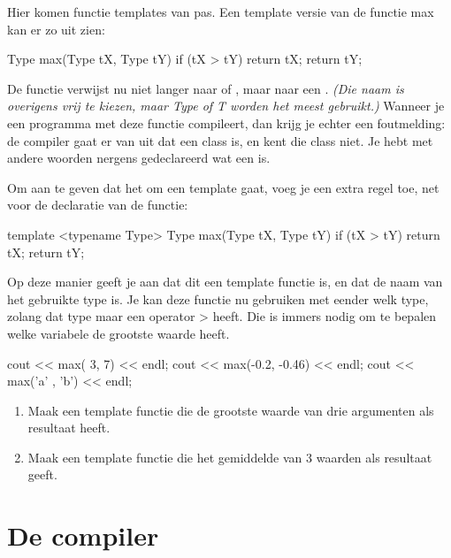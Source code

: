\documentclass[11pt, oldfontcommands, oneside, a4paper]{memoir}
\begin{document}
Hier komen functie templates van pas. Een template versie van de functie max kan er zo uit zien:

\begin{code}
Type max(Type tX, Type tY) {
  if (tX > tY) return tX;
  return tY;
}
\end{code}

De functie verwijst nu niet langer naar  of , maar naar een . \textsl{(Die naam is overigens vrij te kiezen, maar Type of T worden het meest gebruikt.)} Wanneer je een programma met deze functie compileert, dan krijg je echter een foutmelding: de compiler gaat er van uit dat  een class is, en kent die class niet. Je hebt met andere woorden nergens gedeclareerd wat een  is.

Om aan te geven dat het om een template gaat, voeg je een extra regel toe, net voor de declaratie van de functie:

\begin{code}
template <typename Type>
Type max(Type tX, Type tY) {
  if (tX > tY) return tX;
  return tY;
}
\end{code}

Op deze manier geeft je aan dat dit een template functie is, en dat  de naam van het gebruikte type is. Je kan deze functie nu gebruiken met eender welk type, zolang dat type maar een operator > heeft. Die is immers nodig om te bepalen welke variabele de grootste waarde heeft.

\begin{code}
cout << max(   3,     7) << endl;
cout << max(-0.2, -0.46) << endl;
cout << max('a' ,   'b') << endl;
\end{code}

\begin{exercise}
\begin{enumerate}
	\item Maak een template functie  die de grootste waarde van drie argumenten als resultaat heeft.
	\item Maak een template functie  die het gemiddelde van 3 waarden als resultaat geeft.
\end{enumerate}
\end{exercise}

\section{De compiler}
\end{document}
